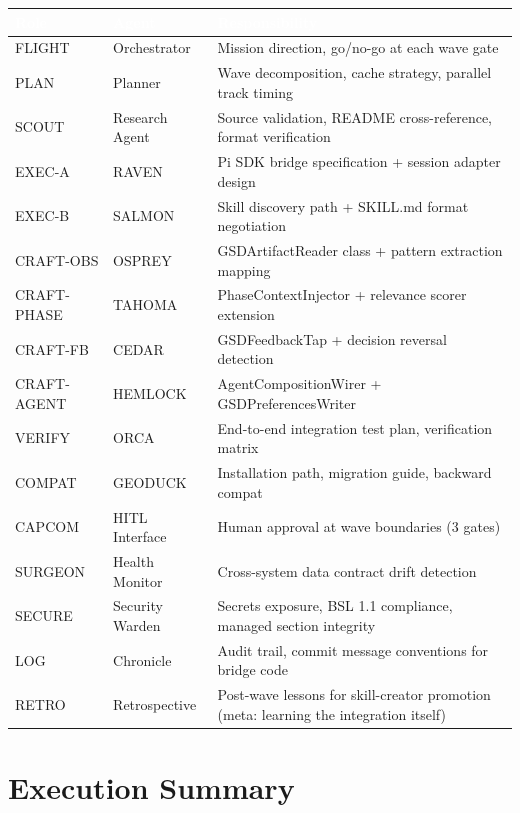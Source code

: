 \documentclass[11pt,letterpaper]{article}
\newcommand{\tableheader}[1]{\textbf{\sffamily\textcolor{white}{#1}}}
\begin{document}
\begin{center}
\begin{tabularx}{\textwidth}{L{2cm}L{3cm}X}
\toprule
{}
\tableheader{Role} & \tableheader{Agent} & \tableheader{Responsibility} \\
\midrule
FLIGHT & Orchestrator & Mission direction, go/no-go at each wave gate \\
PLAN & Planner & Wave decomposition, cache strategy, parallel track timing \\
SCOUT & Research Agent & Source validation, README cross-reference, format verification \\
EXEC-A & RAVEN & Pi SDK bridge specification + session adapter design \\
EXEC-B & SALMON & Skill discovery path + SKILL.md format negotiation \\
CRAFT-OBS & OSPREY & GSDArtifactReader class + pattern extraction mapping \\
CRAFT-PHASE & TAHOMA & PhaseContextInjector + relevance scorer extension \\
CRAFT-FB & CEDAR & GSDFeedbackTap + decision reversal detection \\
CRAFT-AGENT & HEMLOCK & AgentCompositionWirer + GSDPreferencesWriter \\
VERIFY & ORCA & End-to-end integration test plan, verification matrix \\
COMPAT & GEODUCK & Installation path, migration guide, backward compat \\
CAPCOM & HITL Interface & Human approval at wave boundaries (3 gates) \\
SURGEON & Health Monitor & Cross-system data contract drift detection \\
SECURE & Security Warden & Secrets exposure, BSL 1.1 compliance, managed section integrity \\
LOG & Chronicle & Audit trail, commit message conventions for bridge code \\
RETRO & Retrospective & Post-wave lessons for skill-creator promotion (meta: learning the integration itself) \\
\bottomrule
\end{tabularx}
\end{center}

\section{Execution Summary}
\end{document}
